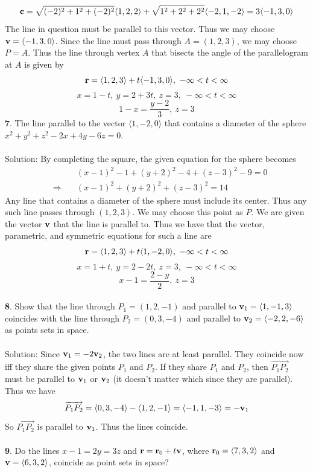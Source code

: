 \documentclass[12pt]{amsbook}
\newcommand{\la}{\langle}
\newcommand{\ra}{\rangle}
\begin{document}
$${\bf c}=\sqrt{(-2)^2+1^2+(-2)^2}\la 1,2,2 \ra +\sqrt{1^2+2^2+2^2}\la -2,1,-2\ra=3\la -1,3,0\ra$$
The line in question must be parallel to this vector. Thus we may choose ${\bf v}=\la -1,3,0\ra$. Since the line must pass through $A=(1,2,3)$, we may choose $P=A$. Thus the line through vertex $A$ that bisects the angle of the parallelogram at $A$ is given by
 $${\bf r} = \la 1,2,3\ra +t\la -1,3,0\ra, \ -\infty<t<\infty$$
 $$x=1-t, \ y=2+3t, \ z=3, \ -\infty<t<\infty$$
 $$1-x=\frac{y-2}{3}, \ z=3$$
{\small\bf 7}. The line parallel to the vector $\la 1,-2,0\ra$
that contains a diameter of the sphere $x^2+y^2+z^2-2x+4y-6z=0$.
\\
\\
{\sc Solution}: By completing the square, the given equation for the sphere becomes
\begin{eqnarray*}
&&\quad (x-1)^2-1+(y+2)^2-4+(z-3)^2-9=0\\
&\Rightarrow&\quad
(x-1)^2+(y+2)^2+(z-3)^2=14
\end{eqnarray*}
Any line that contains a diameter of the sphere must include its center. Thus any such line passes through $(1,2,3)$. We may choose this point as $P$. We are given the vector ${\bf v}$ that the line is parallel to. Thus we have that the vector, parametric, and symmetric equations for such a line are
 $${\bf r} = \la 1,2,3\ra +t\la 1,-2,0\ra, \ -\infty<t<\infty$$
 $$x=1+t, \ y=2-2t, \ z=3, \ -\infty<t<\infty$$
 $$x-1=\frac{2-y}{2}, \ z=3$$
\\  
{\small\bf 8}. Show that the line through $P_1=(1,2,-1)$ and 
parallel to ${\bf v}_1=\la 1,-1,3\ra$ coincides with the 
line through $P_2=(0,3,-4)$ and parallel to ${\bf v}_2=\la -2,2,-6\ra$
as points sets in space.\\
\\
{\sc Solution}: Since ${\bf v}_1=-2{\bf v}_2$, the two lines are at least parallel. They coincide now iff they share the given points $P_1$ and $P_2$. If they share $P_1$ and $P_2$, then $\overrightarrow{P_1P_2}$ must be parallel to ${\bf v}_1$ or ${\bf v}_2$ (it doesn't matter which since they are parallel). Thus we have
$$\overrightarrow{P_1P_2}=\la 0,3,-4 \ra - \la 1,2,-1 \ra = \la -1, 1, -3 \ra = -{\bf v}_1$$
So $\overrightarrow{P_1P_2}$ is parallel to ${\bf v}_1$. Thus the lines coincide.
\\
\\
{\small\bf 9}. Do the lines $x-1=2y=3z$ and ${\bf r}={\bf r}_0+t{\bf v}$,
where ${\bf r}_0=\la 7,3,2\ra$ and ${\bf v}=\la 6,3,2\ra$, coincide as point
sets in space?\\
\end{document}
